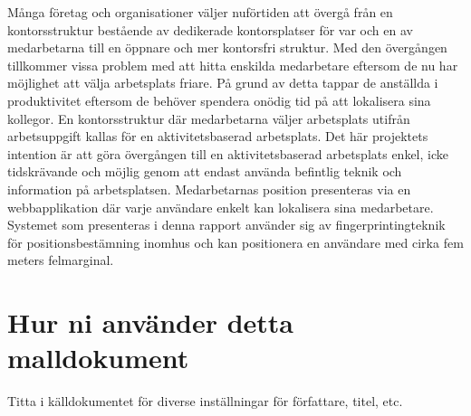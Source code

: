 \documentclass[a4paper,12pt]{article}
\begin{document}
\begin{sammanfattning}
  Många företag och organisationer väljer nuförtiden att övergå från en kontorsstruktur bestående av dedikerade kontorsplatser för var och en av medarbetarna till en öppnare och mer kontorsfri struktur. Med den övergången tillkommer vissa problem med att hitta enskilda medarbetare eftersom de nu har möjlighet att välja arbetsplats friare. På grund av detta tappar de anställda i produktivitet eftersom de behöver spendera onödig tid på att lokalisera sina kollegor. En kontorsstruktur där medarbetarna väljer arbetsplats utifrån arbetsuppgift kallas för en aktivitetsbaserad arbetsplats. Det här projektets intention är att göra övergången till en aktivitetsbaserad arbetsplats enkel, icke tidskrävande och möjlig genom att endast använda befintlig teknik och information på arbetsplatsen. Medarbetarnas position presenteras via en webbapplikation där varje användare enkelt kan lokalisera sina medarbetare. Systemet som presenteras i denna rapport använder sig av fingerprintingteknik för positionsbestämning inomhus och kan positionera en användare med cirka fem meters felmarginal.

\end{sammanfattning}

\tableofcontents


\cleardoublepage


\mainmatter

\iffalse
\section*{Hur ni använder detta malldokument}
Titta i källdokumentet för diverse inställningar för författare, titel, etc.
\end{document}
